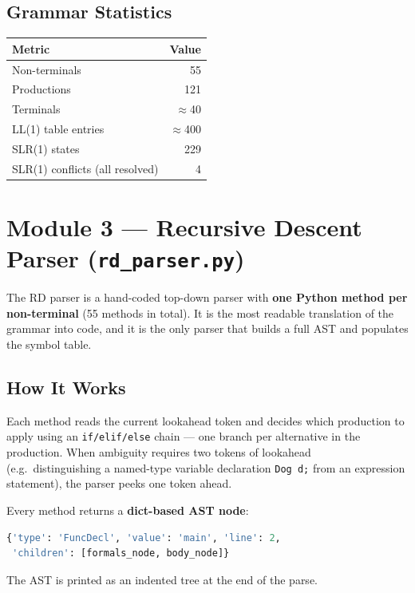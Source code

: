 \documentclass[12pt,a4paper]{article}
\begin{document}
\subsection*{Grammar Statistics}
\begin{center}
\begin{tabular}{lr}
\toprule
\textbf{Metric} & \textbf{Value} \\
\midrule
Non-terminals & 55 \\
Productions   & 121 \\
Terminals     & $\approx$40 \\
LL(1) table entries & $\approx$400 \\
SLR(1) states & 229 \\
SLR(1) conflicts (all resolved) & 4 \\
\bottomrule
\end{tabular}
\end{center}

\section{Module 3 — Recursive Descent Parser (\texttt{rd\_parser.py})}

The RD parser is a hand-coded top-down parser with \textbf{one Python method per
non-terminal} (55 methods in total). It is the most readable translation of the
grammar into code, and it is the only parser that builds a full AST and populates
the symbol table.

\subsection*{How It Works}
Each method reads the current lookahead token and decides which production to apply
using an \texttt{if/elif/else} chain — one branch per alternative in the
production. When ambiguity requires two tokens of lookahead (e.g.\ distinguishing
a named-type variable declaration \texttt{Dog d;} from an expression statement),
the parser peeks one token ahead.

Every method returns a \textbf{dict-based AST node}:
\begin{lstlisting}[language=Python]
{'type': 'FuncDecl', 'value': 'main', 'line': 2,
 'children': [formals_node, body_node]}
\end{lstlisting}
The AST is printed as an indented tree at the end of the parse.
\end{document}
